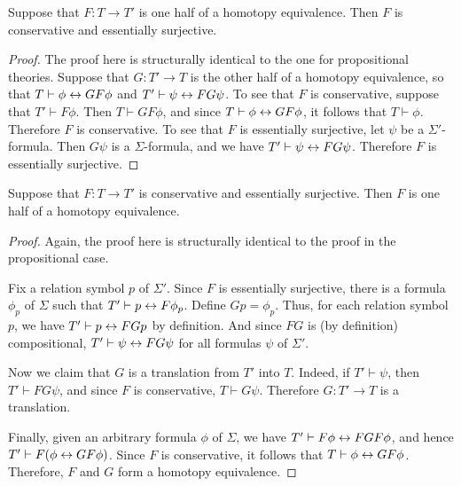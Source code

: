 \begin{prop} Suppose that $F:T\to T'$ is one half of a homotopy
  equivalence.  Then $F$ is conservative and essentially
  surjective. \end{prop}

\begin{proof} The proof here is structurally identical to the one for
  propositional theories.  Suppose that $G:T'\to T$ is the other half
  of a homotopy equivalence, so that $T\vdash \phi\leftrightarrow GF\phi$ and
  $T'\vdash \psi\leftrightarrow FG\psi$.  To see that $F$ is conservative,
  suppose that $T'\vdash F\phi$.  Then $T\vdash GF\phi$, and since
  $T\vdash \phi\leftrightarrow GF\phi$, it follows that $T\vdash \phi$.
  Therefore $F$ is conservative.  To see that $F$ is essentially
  surjective, let $\psi$ be a $\Sigma '$-formula.  Then $G\psi$ is a
  $\Sigma$-formula, and we have $T'\vdash \psi\leftrightarrow FG\psi$.  Therefore
  $F$ is essentially surjective.
\end{proof}

\begin{prop} Suppose that $F:T\to T'$ is conservative and essentially
  surjective.  Then $F$ is one half of a homotopy
  equivalence. \end{prop}

\begin{proof} Again, the proof here is structurally identical to the
  proof in the propositional case.

  Fix a relation symbol $p$ of $\Sigma '$.  Since $F$ is essentially
  surjective, there is a formula $\phi _p$ of $\Sigma$ such that
  $T'\vdash p\leftrightarrow F\phi _p$.  Define $Gp=\phi _p$.  Thus, for each
  relation symbol $p$, we have $T'\vdash p\leftrightarrow FGp$ by definition.
  And since $FG$ is (by definition) compositional,
  $T'\vdash \psi\leftrightarrow FG\psi$ for all formulas $\psi$ of $\Sigma '$.

  Now we claim that $G$ is a translation from $T'$ into $T$.  Indeed,
  if $T'\vdash \psi$, then $T'\vdash FG\psi$, and since $F$ is
  conservative, $T\vdash G\psi$.  Therefore $G:T'\to T$ is a
  translation.

  Finally, given an arbitrary formula $\phi$ of $\Sigma$, we have
  $T'\vdash F\phi\leftrightarrow FGF\phi$, and hence
  $T'\vdash F(\phi\leftrightarrow GF\phi )$.  Since $F$ is conservative, it
  follows that $T\vdash \phi\leftrightarrow GF\phi$.  Therefore, $F$ and $G$ form
  a homotopy equivalence.
\end{proof}



